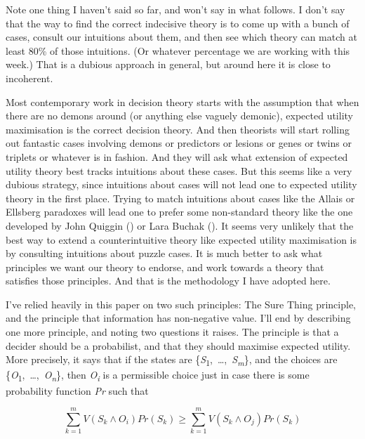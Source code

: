 \documentclass[
  10pt,
  letterpaper,
  DIV=11,
  numbers=noendperiod,
  twoside]{scrartcl}
\begin{document}
Note one thing I haven't said so far, and won't say in what follows. I
don't say that the way to find the correct indecisive theory is to come
up with a bunch of cases, consult our intuitions about them, and then
see which theory can match at least 80\% of those intuitions. (Or
whatever percentage we are working with this week.) That is a dubious
approach in general, but around here it is close to incoherent.

Most contemporary work in decision theory starts with the assumption
that when there are no demons around (or anything else vaguely demonic),
expected utility maximisation is the correct decision theory. And then
theorists will start rolling out fantastic cases involving demons or
predictors or lesions or genes or twins or triplets or whatever is in
fashion. And they will ask what extension of expected utility theory
best tracks intuitions about these cases. But this seems like a very
dubious strategy, since intuitions about cases will not lead one to
expected utility theory in the first place. Trying to match intuitions
about cases like the Allais or Ellsberg paradoxes will lead one to
prefer some non-standard theory like the one developed by John Quiggin
() or Lara Buchak
(). It seems very unlikely that the best
way to extend a counterintuitive theory like expected utility
maximisation is by consulting intuitions about puzzle cases. It is much
better to ask what principles we want our theory to endorse, and work
towards a theory that satisfies those principles. And that is the
methodology I have adopted here.

I've relied heavily in this paper on two such principles: The Sure Thing
principle, and the principle that information has non-negative value.
I'll end by describing one more principle, and noting two questions it
raises. The principle is that a decider should be a probabilist, and
that they should maximise expected utility. More precisely, it says that
if the states are
\{\emph{S}\textsubscript{1},~\ldots,~\emph{S\textsubscript{m}}\}, and
the choices are
\{\emph{O}\textsubscript{1},~\ldots,~\emph{O\textsubscript{n}}\}, then
\emph{O\textsubscript{i}} is a permissible choice just in case there is
some probability function \emph{Pr} such that

\[
\sum_{k = 1}^m V(S_k \wedge O_i)Pr(S_k) \geq \sum_{k = 1}^m V(S_k \wedge O_j)Pr(S_k)
\]
\end{document}
